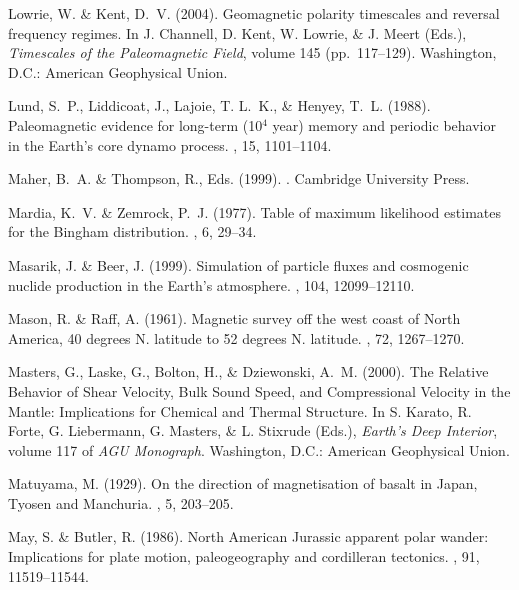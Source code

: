 \documentclass[11pt]{book}
\begin{document}
\begin{thebibliography}{}
Lowrie, W. \& Kent, D.~V. (2004).
\newblock Geomagnetic polarity timescales and reversal frequency regimes.
\newblock In J. Channell, D. Kent, W. Lowrie, \& J. Meert (Eds.), {\em
  Timescales of the Paleomagnetic Field}, volume 145  (pp.\ 117--129).
  Washington, D.C.: American Geophysical Union.

Lund, S.~P., Liddicoat, J., Lajoie, T. L.~K., \& Henyey, T.~L. (1988).
\newblock Paleomagnetic evidence for long-term (10$^4$ year) memory and
  periodic behavior in the Earth's core dynamo process.
, 15, 1101--1104.

Maher, B.~A. \& Thompson, R., Eds. (1999).
.
\newblock Cambridge University Press.

Mardia, K.~V. \& Zemrock, P.~J. (1977).
\newblock Table of maximum likelihood estimates for the Bingham distribution.
, 6, 29--34.

Masarik, J. \& Beer, J. (1999).
\newblock Simulation of particle fluxes and cosmogenic nuclide production in
  the Earth's atmosphere.
, 104, 12099--12110.

Mason, R. \& Raff, A. (1961).
\newblock Magnetic survey off the west coast of North America, 40 degrees N.
  latitude to 52 degrees N. latitude.
, 72, 1267--1270.

Masters, G., Laske, G., Bolton, H., \& Dziewonski, A.~M. (2000).
\newblock The Relative Behavior of Shear Velocity, Bulk Sound Speed, and
  Compressional Velocity in the Mantle: Implications for Chemical and Thermal
  Structure.
\newblock In S. Karato, R. Forte, G. Liebermann, G. Masters, \& L. Stixrude
  (Eds.), {\em Earth's Deep Interior}, volume 117 of {\em AGU Monograph}.
  Washington, D.C.: American Geophysical Union.

Matuyama, M. (1929).
\newblock On the direction of magnetisation of basalt in Japan, Tyosen and
  Manchuria.
, 5, 203--205.

May, S. \& Butler, R. (1986).
\newblock North American Jurassic apparent polar wander: Implications for plate
  motion, paleogeography and cordilleran tectonics.
, 91, 11519--11544.


\end{thebibliography}
\end{document}
